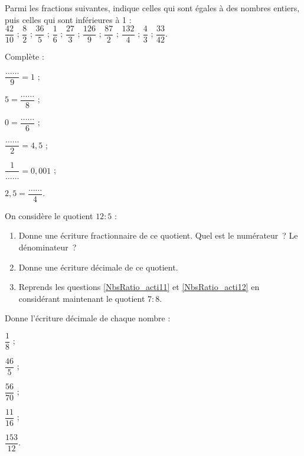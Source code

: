 \newpage


\begin{exercice}
Parmi les fractions suivantes, indique celles qui sont égales à des nombres entiers, puis celles qui sont inférieures à 1 : \\[0.3em]
$\dfrac{42}{10}$ ; $\dfrac{8}{2}$ ; $\dfrac{36}{5}$ ; $\dfrac{1}{6}$ ; $\dfrac{27}{3}$ ; $\dfrac{126}{9}$ ; $\dfrac{87}{2}$ ; $\dfrac{132}{4}$ ; $\dfrac{4}{3}$ ; $\dfrac{33}{42}$.
\end{exercice}


\begin{exercice}
Complète :\\[0.1em]
\begin{colenumerate}{3}
 \item $\dfrac{\ldots \ldots}{9} = 1$ ;
 \item $5 = \dfrac{\ldots \ldots}{8}$ ;
 \item $0 = \dfrac{\ldots \ldots}{6}$ ;
 \item $\dfrac{\ldots \ldots}{2} = 4,5$ ;
 \item $\dfrac{1}{\ldots \ldots} = 0,001$ ;
 \item $2,5 = \dfrac{\ldots \ldots}{4}$.
 \end{colenumerate}
\end{exercice}


\begin{exercice}
On considère le quotient $12 : 5$ :
\begin{enumerate}
 \item Donne une écriture fractionnaire de ce quotient. Quel est le numérateur ? Le dénominateur ? \label{NbsRatio_acti11}
 \item Donne une écriture décimale de ce quotient. \label{NbsRatio_acti12}
 \item Reprends les questions \ref{NbsRatio_acti11} et \ref{NbsRatio_acti12} en considérant maintenant le quotient $7 : 8$.
 \end{enumerate}
\end{exercice}


\begin{exercice}
Donne l'écriture décimale de chaque nombre :
\begin{colenumerate}{5}
 \item $\dfrac{1}{8}$ ; 
 \item $\dfrac{46}{5}$ ; 
 \item $\dfrac{56}{70}$ ; 
 \item $\dfrac{11}{16}$ ; 
 \item $\dfrac{153}{12}$.
 \end{colenumerate}
\end{exercice}



